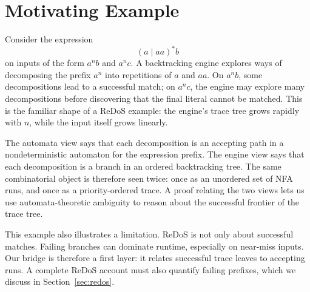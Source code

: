 \section{Motivating Example}

Consider the expression
\[
  (a \mid aa)^{*} b
\]
on inputs of the form \(a^n b\) and \(a^n c\).  A backtracking engine explores
ways of decomposing the prefix \(a^n\) into repetitions of \(a\) and \(aa\).
On \(a^n b\), some decompositions lead to a successful match; on \(a^n c\),
the engine may explore many decompositions before discovering that the final
literal cannot be matched.  This is the familiar shape of a ReDoS example:
the engine's trace tree grows rapidly with \(n\), while the input itself grows
linearly.

The automata view says that each decomposition is an accepting path in a
nondeterministic automaton for the expression prefix.  The engine view says that
each decomposition is a branch in an ordered backtracking tree.  The same
combinatorial object is therefore seen twice: once as an unordered set of NFA
runs, and once as a priority-ordered trace.  A proof relating the two views lets
us use automata-theoretic ambiguity to reason about the successful frontier of
the trace tree.

This example also illustrates a limitation.  ReDoS is not only about successful
matches.  Failing branches can dominate runtime, especially on near-miss inputs.
Our bridge is therefore a first layer: it relates successful trace leaves to
accepting runs.  A complete ReDoS account must also quantify failing prefixes,
which we discuss in Section~\ref{sec:redos}.
